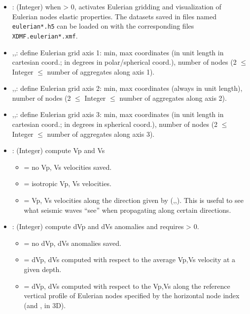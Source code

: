 \begin{itemize}
    \item {}: (Integer) when > 0, activates Eulerian gridding and visualization of Eulerian nodes elastic properties. The datasets saved in files named \texttt{eulerian*.h5} can be loaded on \paraviewtitle{} with the corresponding files \texttt{XDMF.eulerian*.xmf}.

	\item {},,: define Eulerian grid axis 1: min, max coordinates (in unit length in cartesian coord.; in degrees in polar/spherical coord.), number of nodes (2 $\leq$ Integer $\leq$ number of aggregates along axis 1).  
	\item {},,: define Eulerian grid axis 2: min, max coordinates (always in unit length), number of nodes (2 $\leq$ Integer $\leq$ number of aggregates along axis 2).  
	\item {},,: define Eulerian grid axis 3: min, max coordinates (in unit length in cartesian coord.; in degrees in spherical coord.), number of nodes (2 $\leq$ Integer $\leq$ number of aggregates along axis 3).  

	\item {}: (Integer) compute Vp and Vs 
	\begin{itemize}
        \item[]  = no Vp, Vs velocities saved.
        \item[]  = isotropic Vp, Vs velocities.
        \item[]  = Vp, Vs velocities along the direction given by (,,). This is useful to see what seismic waves “see” when propagating along certain directions.
    \end{itemize}
    
	\item {}: (Integer) compute dVp and dVs anomalies and requires  > 0.
    \begin{itemize}
        \item[]  = no dVp, dVs anomalies saved.
        \item[]  = dVp, dVs computed with respect to the average Vp,Vs velocity at a given depth.
        \item[]  = dVp, dVs computed with respect to the Vp,Vs along the reference vertical profile of Eulerian nodes specified by the horizontal node index  (and , in 3D).
    \end{itemize}


\end{itemize}
